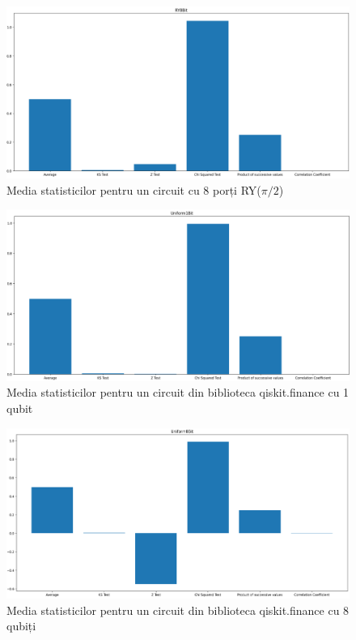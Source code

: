 \begin{figure}[H]
    \centering
    \includegraphics[width=1.0\textwidth]{continut/capitol4/figuri/StatsRY8Bit.png}
    \caption{Media statisticilor pentru un circuit cu 8 porți RY($\pi/2$)}
    \label{fig:StatsBarRY8Bit}
\end{figure}

\begin{figure}[H]
    \centering
    \includegraphics[width=1.0\textwidth]{continut/capitol4/figuri/StatsUniform1Bit.png}
    \caption{Media statisticilor pentru un circuit din biblioteca qiskit.finance cu 1 qubit}
    \label{fig:StatsBarUniform1Bit}
\end{figure}

\begin{figure}[H]
    \centering
    \includegraphics[width=1.0\textwidth]{continut/capitol4/figuri/StatsUniform8Bit.png}
    \caption{Media statisticilor pentru un circuit din biblioteca qiskit.finance cu 8 qubiți}
    \label{fig:StatsBarUniform8Bit}
\end{figure}

